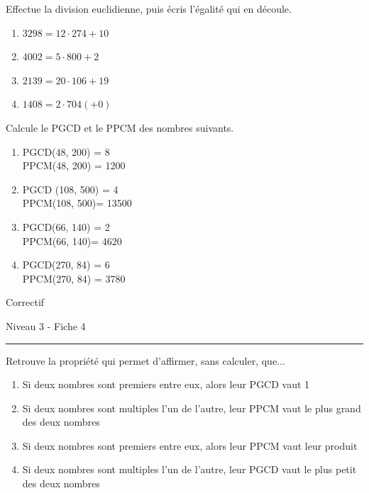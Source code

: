\documentclass[12pt,parskip=half-, twoside=semi]{scrartcl}
\begin{document}
\begin{exercise}
Effectue la division euclidienne, puis écris l'égalité qui en découle. 
\begin{enumerate}[cols=2]
\item \(3298 = 12 \cdot 274 + 10\)
\item \(4002 = 5 \cdot 800 + 2\)
\item \(2139=20 \cdot 106 + 19\)
\item \(1408 = 2 \cdot 704 (+0)\)
\end{enumerate}
\end{exercise}

\begin{exercise}
Calcule le PGCD et le PPCM des nombres suivants. 
\begin{enumerate}[cols=2]
\item  PGCD(48, 200) = 8 \\ PPCM(48, 200) = 1200 
\item PGCD (108, 500) = 4 \\ PPCM(108, 500)= 13500
\item PGCD(66, 140) = 2 \\ PPCM(66, 140)= 4620
\item PGCD(270, 84) = 6 \\ PPCM(270, 84) = 3780
\end{enumerate}
\end{exercise}

\newpage

\begin{center}
  \bfseries
  \begin{Huge}
    Correctif
  \end{Huge}
  \smallbreak
  \begin{large}
    Niveau 3    - Fiche 4
  \end{large}
  \smallbreak
  \rule[10pt]{.5\linewidth}{1 pt}
\end{center}

\setcounter{exercise}{0}
      
\begin{exercise}
  Retrouve la propriété qui permet d'affirmer, sans calculer, que...
  \begin{enumerate}
    \item Si deux nombres sont premiers entre eux, alors leur PGCD vaut 1
    \item Si deux nombres sont multiples l'un de l'autre, leur PPCM vaut le plus grand des deux nombres
    \item Si deux nombres sont premiers entre eux, alors leur PPCM vaut leur produit
    \item Si deux nombres sont multiples l'un de l'autre, leur PGCD vaut le plus petit des deux nombres
  \end{enumerate}
\end{exercise}
\end{document}
